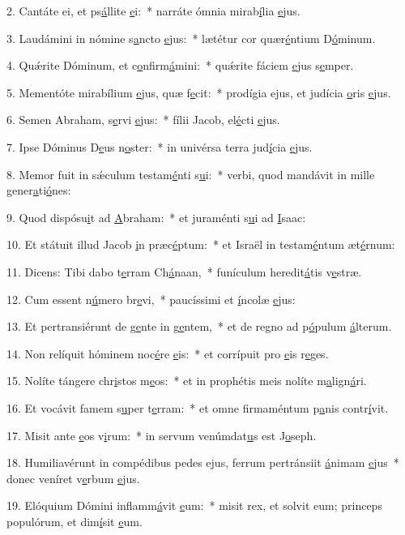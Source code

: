 2. Cantáte ei, et ps\uline{á}llite \uline{e}i:~* narráte ómnia mirab\uline{í}lia \uline{e}jus.\par 
3. Laudámini in nómine s\uline{a}ncto \uline{e}jus:~* lætétur cor quær\uline{é}ntium D\uline{ó}minum.\par 
4. Quǽrite Dóminum, et c\uline{o}nfirm\uline{á}mini:~* quǽrite fáciem \uline{e}jus s\uline{e}mper.\par 
5. Mementóte mirabílium \uline{e}jus, quæ f\uline{e}cit:~* prodígia ejus, et judícia \uline{o}ris \uline{e}jus.\par 
6. Semen Abraham, s\uline{e}rvi \uline{e}jus:~* fílii Jacob, el\uline{é}cti \uline{e}jus.\par 
7. Ipse Dóminus D\uline{e}us n\uline{o}ster:~* in univérsa terra jud\uline{í}cia \uline{e}jus.\par 
8. Memor fuit in sǽculum testam\uline{é}nti s\uline{u}i:~* verbi, quod mandávit in mille gener\uline{a}ti\uline{ó}nes:\par 
9. Quod dispósu\uline{i}t ad \uline{A}braham:~* et juraménti s\uline{u}i ad \uline{I}saac:\par 
10. Et státuit illud Jacob \uline{i}n præc\uline{é}ptum:~* et Israël in testam\uline{é}ntum æt\uline{é}rnum:\par 
11. Dicens: Tibi dabo t\uline{e}rram Ch\uline{á}naan,~* funículum heredit\uline{á}tis v\uline{e}stræ.\par 
12. Cum essent n\uline{ú}mero br\uline{e}vi,~* paucíssimi et \uline{í}ncolæ \uline{e}jus:\par 
13. Et pertransiérunt de g\uline{e}nte in g\uline{e}ntem,~* et de regno ad p\uline{ó}pulum \uline{á}lterum.\par 
14. Non relíquit hóminem noc\uline{é}re \uline{e}is:~* et corrípuit pro \uline{e}is r\uline{e}ges.\par 
15. Nolíte tángere chr\uline{i}stos m\uline{e}os:~* et in prophétis meis nolíte m\uline{a}lign\uline{á}ri.\par 
16. Et vocávit famem s\uline{u}per t\uline{e}rram:~* et omne firmaméntum p\uline{a}nis contr\uline{í}vit.\par 
17. Misit ante \uline{e}os v\uline{i}rum:~* in servum venúmdat\uline{u}s est J\uline{o}seph.\par 
18. Humiliavérunt in compédibus pedes ejus, ferrum pertránsiit \uline{á}nimam \uline{e}jus~* donec veníret v\uline{e}rbum \uline{e}jus.\par 
19. Elóquium Dómini inflamm\uline{á}vit \uline{e}um:~* misit rex, et solvit eum; princeps populórum, et dim\uline{í}sit \uline{e}um.\par 
